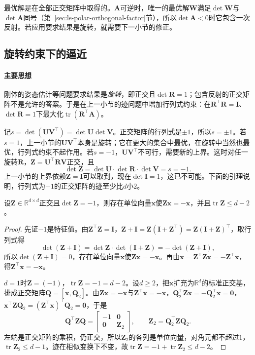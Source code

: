 最优解是在全部正交矩阵中取得的。$\bm A$可逆时，唯一的最优解$\bm W$满足$\det\bm W$与$\det\bm A$同号（第~\ref{sec:ls-polar-orthogonal-factor}节），所以$\det\bm A<0$时它包含一次反射。若应用要求结果是旋转，就需要下一小节的修正。

\subsection{旋转约束下的逼近}
\label{sec:matrix-approximation-rotation}

\paragraph{主要思想}

刚体的姿态估计等问题要求结果是\emph{旋转}，即正交且$\det\bm R=1$；包含反射的正交矩阵不是允许的答案。于是在上一小节的迹问题中增加行列式约束：在$\bm R^\top\bm R=\bm I$、$\det\bm R=1$下最大化$\operatorname{tr}(\bm R^\top\bm A)$。

记$s=\det(\bm U\bm V^\top)=\det\bm U\det\bm V$。正交矩阵的行列式是$\pm1$，所以$s=\pm1$。若$s=1$，上一小节的$\bm U\bm V^\top$本身是旋转；它在更大的集合中最优，在旋转中当然也最优，行列式约束不起作用。若$s=-1$，$\bm U\bm V^\top$不可行，需要新的上界。这时对任一旋转$\bm R$，$\bm Z=\bm U^\top\bm R\bm V$正交，且
\[
 \det\bm Z=\det\bm U\cdot\det\bm R\cdot\det\bm V=s=-1 .
\]
上一小节的上界依赖$\bm Z=\bm I$可以取到，现在$\det\bm I=1$，这已不可能。下面的引理说明，行列式为$-1$的正交矩阵的迹至少比$d$小$2$。

\begin{lemma}[行列式为负的正交矩阵的迹]
\label{lem:matrix-approximation-reflection-trace}
设$\bm Z\in\mathbb R^{d\times d}$正交且$\det\bm Z=-1$，则存在单位向量$\bm x$使$\bm Z\bm x=-\bm x$，并且$\operatorname{tr}\bm Z\leq d-2$。
\end{lemma}
\begin{proof}
先证$-1$是特征值。由$\bm Z^\top\bm Z=\bm I$，$\bm Z+\bm I=\bm Z(\bm I+\bm Z^\top)=\bm Z(\bm I+\bm Z)^\top$，取行列式得
\[
 \det(\bm Z+\bm I)=\det\bm Z\cdot\det(\bm I+\bm Z)=-\det(\bm Z+\bm I),
\]
所以$\det(\bm Z+\bm I)=0$，存在单位向量$\bm x$使$\bm Z\bm x=-\bm x$。再由$\bm x=\bm Z^\top\bm Z\bm x=-\bm Z^\top\bm x$，得$\bm Z^\top\bm x=-\bm x$。

$d=1$时$\bm Z=(-1)$，$\operatorname{tr}\bm Z=-1=d-2$。设$d\geq2$，把$\bm x$扩充为$\mathbb R^d$的标准正交基，排成正交矩阵$\bm Q=[\bm x,\bm Q_2]$。由$\bm Z\bm x=-\bm x$与$\bm Z^\top\bm x=-\bm x$，$\bm Q_2^\top\bm Z\bm x=-\bm Q_2^\top\bm x=\bm0$，$\bm x^\top\bm Z\bm Q_2=(\bm Z^\top\bm x)^\top\bm Q_2=\bm0$，于是
\[
 \bm Q^\top\bm Z\bm Q=\begin{bmatrix}-1&\bm0\\\bm0&\bm Z_2\end{bmatrix},\qquad\bm Z_2=\bm Q_2^\top\bm Z\bm Q_2 .
\]
左端是正交矩阵的乘积，仍正交，所以$\bm Z_2$的各列是单位向量，对角元都不超过$1$，$\operatorname{tr}\bm Z_2\leq d-1$。迹在相似变换下不变，故$\operatorname{tr}\bm Z=-1+\operatorname{tr}\bm Z_2\leq d-2$。
\end{proof}

